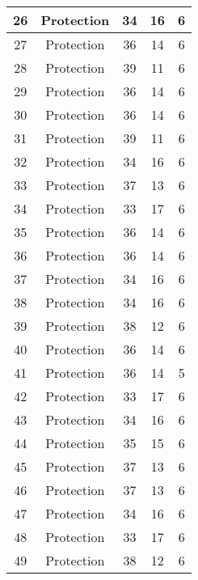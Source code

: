 \documentclass[results.tex]{subfiles}
\begin{document}
\begin{center}
\begin{tabular}{| c || c | c | c | c |}
    \hline
    26 & Protection & 34 & 16 & 6 \\ 
    \hline
    27 & Protection & 36 & 14 & 6 \\ 
    \hline
    28 & Protection & 39 & 11 & 6 \\ 
    \hline
    29 & Protection & 36 & 14 & 6 \\ 
    \hline
    30 & Protection & 36 & 14 & 6 \\ 
    \hline
    31 & Protection & 39 & 11 & 6 \\ 
    \hline
    32 & Protection & 34 & 16 & 6 \\ 
    \hline
    33 & Protection & 37 & 13 & 6 \\ 
    \hline
    34 & Protection & 33 & 17 & 6 \\ 
    \hline
    35 & Protection & 36 & 14 & 6 \\ 
    \hline
    36 & Protection & 36 & 14 & 6 \\ 
    \hline
    37 & Protection & 34 & 16 & 6 \\ 
    \hline
    38 & Protection & 34 & 16 & 6 \\ 
    \hline
    39 & Protection & 38 & 12 & 6 \\ 
    \hline
    40 & Protection & 36 & 14 & 6 \\ 
    \hline
    41 & Protection & 36 & 14 & 5 \\ 
    \hline
    42 & Protection & 33 & 17 & 6 \\ 
    \hline
    43 & Protection & 34 & 16 & 6 \\ 
    \hline
    44 & Protection & 35 & 15 & 6 \\ 
    \hline
    45 & Protection & 37 & 13 & 6 \\ 
    \hline
    46 & Protection & 37 & 13 & 6 \\ 
    \hline
    47 & Protection & 34 & 16 & 6 \\ 
    \hline
    48 & Protection & 33 & 17 & 6 \\ 
    \hline
    49 & Protection & 38 & 12 & 6 \\ 
    \hline   \end{tabular}
\end{center}
\end{document}
